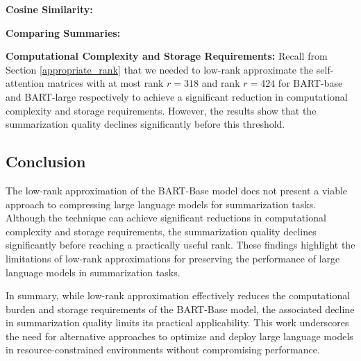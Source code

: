     \textbf{Cosine Similarity:}

    \textbf{Comparing Summaries:}
        
    \textbf{Computational Complexity and Storage Requirements:}
    Recall from Section \ref{appropriate_rank} that we needed to low-rank approximate the self-attention matrices with at most rank \(r = 318\) and rank \(r = 424\) for BART-base and BART-large respectively to achieve a significant reduction in computational complexity and storage requirements. However, the results show that the summarization quality declines significantly before this threshold.


    \subsection{Conclusion}
    The low-rank approximation of the BART-Base model does not present a viable approach to compressing large language models for summarization tasks. Although the technique can achieve significant reductions in computational complexity and storage requirements, the summarization quality declines significantly before reaching a practically useful rank. These findings highlight the limitations of low-rank approximations for preserving the performance of large language models in summarization tasks.
    
    In summary, while low-rank approximation effectively reduces the computational burden and storage requirements of the BART-Base model, the associated decline in summarization quality limits its practical applicability. This work underscores the need for alternative approaches to optimize and deploy large language models in resource-constrained environments without compromising performance.
    